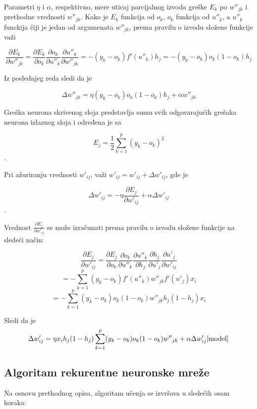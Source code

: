 \documentclass[a4paper]{article}
\begin{document}
Parametri $\eta{}$ i $\alpha{}$, respektivno, mere uticaj parcijalnog izvoda greške $E_k$ po $w{''}_{jk}$ i prethodne vrednosti \Delta{}$w{''}_{jk}$. Kako je $E_k$ funkcija od $o_k$, $o_k$ funkcija od $u{''}_k$, a $u{''}_k$ funckija čiji je jedan od argumenata $w{''}_{jk}$, prema pravilu o izvodu složene funkcije važi 

$$\frac{\partial{}E_k}{\partial{}w{''}_{jk}} = \frac{\partial{}E_k}{\partial{}o_{k}}\frac{\partial{}o_k}{\partial{}u{''}_{k}}\frac{\partial{}u{''}_k}{\partial{}w{''}_{jk}} = -(y_k-o_k)f'(u{''}_k)h_j = -(y_k-o_k)o_k(1-o_k)h_j$$

Iz poslednjeg reda sledi da je 

$$\Delta{}w{''}_{jk}=\eta{}(y_k-o_k)o_k(1-o_k)h_j+\alpha{}w{''}_{jk}$$

Greška neurona skrivenog sloja predstavlja sumu svih odgovarajućih grešaka neurona izlaznog sloja i određena je sa

$$E_j = \frac{1}{2}\sum_{k=1}^p(y_k - o_k)^2$$.

Pri ažuriranju vrednosti $w'_{ij}$, važi $w'_{ij}=w'_{ij} + \Delta{}w'_{ij}$, gde je

$$\Delta{}{}w'_{ij} = - \eta{}\frac{\partial{}E_j}{\partial{}w{'}_{ij}}+\alpha{}\Delta{}w'_{ij}$$.

Vrednost $\frac{\partial{}E_j}{\partial{}w'_{ij}}$ se može izračunati prema pravilu o izvodu složene funkcije na sledeći način:

$$\frac{\partial{}E_j}{\partial{}w'_{ij}}=\frac{\partial{}E_j}{\partial{}o_{k}}\frac{\partial{}o_k}{\partial{}u{''}_{k}}\frac{\partial{}u{''}_k}{\partial{}h_{j}}\frac{\partial{}h_j}{\partial{}u'_{j}}\frac{\partial{}u'_j}{\partial{}w'_{ij}}$$
$$ = -\sum_{k=1}^p(y_k-o_k)f'(u{''}_k)w{''}_{jk}f'(u'_j)x_i$$
$$ = -\sum_{k=1}^p(y_k-o_k)o_k(1-o_k)w{''}_{jk}h_j(1-h_j)x_i$$

Sledi da je 
$$\Delta{}w'_{ij}=\eta{}x_ih_j(1-h_j)\sum_{k=1}^p(y_k-o_k)o_k(1-o_k)w{''}_{jk} + \alpha{}\Delta{}w'_{ij}\cite{model}$$

\subsection{Algoritam rekurentne neuronske mreže}
\label{sec:model}

Na osnovu prethodnog opisa, algoritam učenja se izvršava u sledećih osam koraka\cite{model}:
\end{document}
